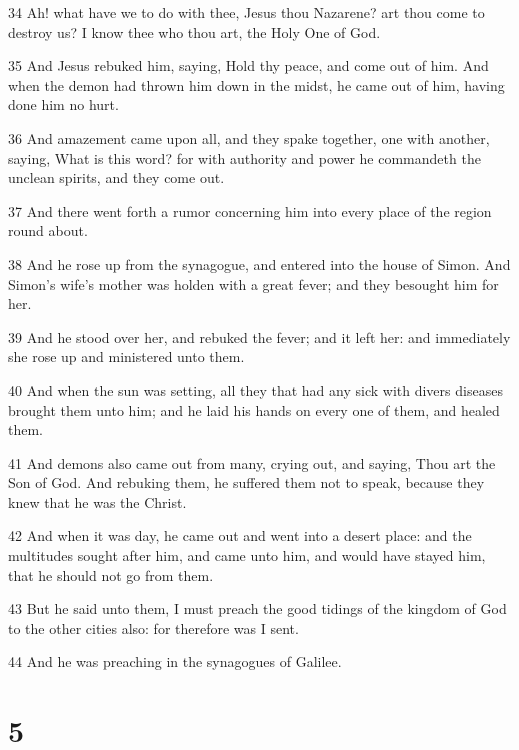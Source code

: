 \par 34 Ah! what have we to do with thee, Jesus thou Nazarene? art thou come to destroy us? I know thee who thou art, the Holy One of God.
\par 35 And Jesus rebuked him, saying, Hold thy peace, and come out of him. And when the demon had thrown him down in the midst, he came out of him, having done him no hurt.
\par 36 And amazement came upon all, and they spake together, one with another, saying, What is this word? for with authority and power he commandeth the unclean spirits, and they come out.
\par 37 And there went forth a rumor concerning him into every place of the region round about.
\par 38 And he rose up from the synagogue, and entered into the house of Simon. And Simon's wife's mother was holden with a great fever; and they besought him for her.
\par 39 And he stood over her, and rebuked the fever; and it left her: and immediately she rose up and ministered unto them.
\par 40 And when the sun was setting, all they that had any sick with divers diseases brought them unto him; and he laid his hands on every one of them, and healed them.
\par 41 And demons also came out from many, crying out, and saying, Thou art the Son of God. And rebuking them, he suffered them not to speak, because they knew that he was the Christ.
\par 42 And when it was day, he came out and went into a desert place: and the multitudes sought after him, and came unto him, and would have stayed him, that he should not go from them.
\par 43 But he said unto them, I must preach the good tidings of the kingdom of God to the other cities also: for therefore was I sent.
\par 44 And he was preaching in the synagogues of Galilee.

\chapter{5}

